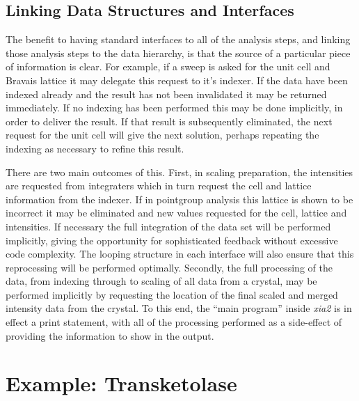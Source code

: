 \documentclass[preprint,pdf]{iucr}
\begin{document}
\subsection{Linking Data Structures and Interfaces}

The benefit to having standard interfaces to all of the analysis
steps, and linking those analysis steps to the data hierarchy, is that
the source of a particular piece of information
is clear. For example, if a sweep is asked for the unit cell and Bravais
lattice it may delegate this request to it's indexer. If the data have
been indexed already and the result has not been invalidated it may be returned
immediately. If no indexing has been performed this may be done
implicitly, in order to deliver the result. If that result is
subsequently eliminated, the next request for the unit cell will give
the next solution, perhaps repeating the indexing as necessary to
refine this result. 

There are two main outcomes of this. First, in scaling preparation, 
the intensities are requested from integraters which in turn request
the cell and lattice
information from the indexer. If in pointgroup analysis this
lattice is shown to be incorrect it may be eliminated and new
values requested for the cell, lattice and intensities. If necessary
the full integration of the data set will be performed implicitly,
giving the opportunity for sophisticated feedback without excessive
code complexity. The looping structure in each interface will also
ensure that this reprocessing will be performed optimally.
Secondly, the full processing
of the data, from indexing through to scaling of all data from a
crystal, may be performed implicitly by requesting the location of the
final scaled and merged intensity data from the crystal. To this end,
the ``main program'' inside \emph{xia2} is in effect a print statement,
with all of the processing performed as a side-effect of providing the
information to show in the output.

\section{Example: Transketolase}
\end{document}
